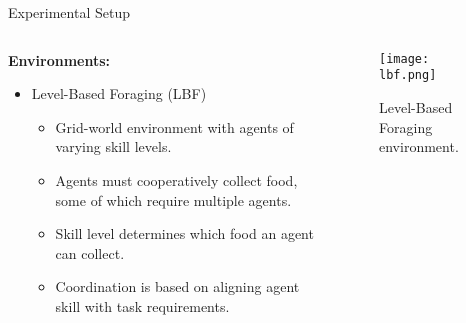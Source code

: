 \begin{frame}{Experimental Setup}
    \begin{columns}
        \begin{column}{0.5\textwidth}
            \textbf{Environments:}
            \begin{itemize}
                \item Level-Based Foraging (LBF)
                \begin{itemize}
                    \item Grid-world environment with agents of varying skill levels.
                    \item Agents must cooperatively collect food, some of which require multiple agents.
                    \item Skill level determines which food an agent can collect.
                    \item Coordination is based on aligning agent skill with task requirements.
                \end{itemize}
            \end{itemize}
            \vfil
        \end{column}
        \begin{column}{0.5\textwidth}
            \begin{figure}
                \texttt{[image: lbf.png]}
                \caption{Level-Based Foraging environment.}
            \end{figure}
        \end{column}
    \end{columns}
\end{frame}


